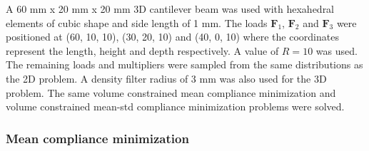   A 60 mm x 20 mm x 20 mm 3D cantilever beam was used with hexahedral elements of cubic shape and side length of 1 mm. The loads $\bm{F}_1$, $\bm{F}_2$ and $\bm{F}_3$ were positioned at (60, 10, 10), (30, 20, 10) and (40, 0, 10) where the coordinates represent the length, height and depth respectively. A value of $R = 10$ was used. The remaining loads and multipliers were sampled from the same distributions as the 2D problem. A density filter radius of 3 mm was also used for the 3D problem. The same volume constrained mean compliance minimization and volume constrained mean-std compliance minimization problems were solved.

  \subsubsection{Mean compliance minimization}

